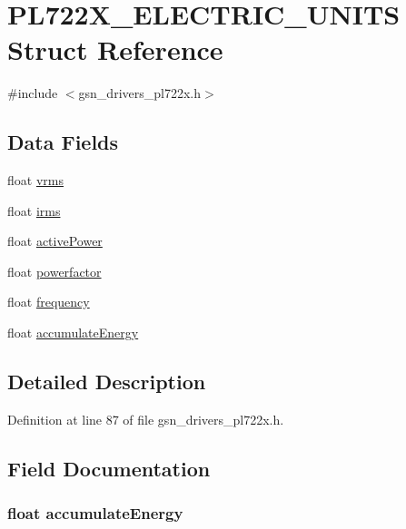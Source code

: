 \hypertarget{a00450}{
\section{PL722X\_\-ELECTRIC\_\-UNITS Struct Reference}
\label{a00450}
}


{\ttfamily \#include $<$gsn\_\-drivers\_\-pl722x.h$>$}

\subsection*{Data Fields}
\begin{DoxyCompactItemize}
\item 
float \hyperlink{a00450_a1466cf22de01e2faf786b69e44e4902f}{vrms}
\item 
float \hyperlink{a00450_af9b0db3f42bdf3f755afe229084986a8}{irms}
\item 
float \hyperlink{a00450_aabf327ff94458c4f133aec441d0de13c}{activePower}
\item 
float \hyperlink{a00450_a29927bc0ca13e270d492593d749bf42e}{powerfactor}
\item 
float \hyperlink{a00450_acdfc8898c9e67fbcec81f3b04ae61bd9}{frequency}
\item 
float \hyperlink{a00450_aebabdaa64f056a946a619c69d25ae98a}{accumulateEnergy}
\end{DoxyCompactItemize}


\subsection{Detailed Description}


Definition at line 87 of file gsn\_\-drivers\_\-pl722x.h.



\subsection{Field Documentation}
\hypertarget{a00450_aebabdaa64f056a946a619c69d25ae98a}{
\subsubsection[{accumulateEnergy}]{\setlength{\rightskip}{0pt plus 5cm}float {\bf accumulateEnergy}}}
\label{a00450_aebabdaa64f056a946a619c69d25ae98a}


